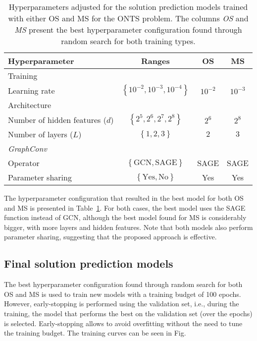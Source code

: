 \begin{table}[h]
    \centering
    \caption{Hyperparameters adjusted for the solution prediction models trained with either OS and MS for the ONTS problem. The columns  \emph{OS} and \emph{MS} present the best hyperparameter configuration found through random search for both training types.}
    \label{tab:hyperparameters}
    \begin{tabular}{l|c|c|c}
	\toprule
	Hyperparameter & Ranges & OS & MS \\
	\midrule
	Training & & & \\
	\quad Learning rate & $\left\{ 10^{-2}, 10^{-3}, 10^{-4} \right\} $   & $10^{-2}$ & $10^{-3}$ \\
	Architecture &  & & \\
	\quad Number of hidden features ($d$) & $\left\{ 2^{5},2^{6},2^{7},2^{8} \right\} $   & $2^{6}$ & $2^{8}$ \\
	\quad Number of layers ($L$)  & $\left\{ 1, 2, 3 \right\} $   & $2$ & $3$ \\
	\emph{GraphConv} &  & & \\
	\quad Operator & $\left\{ \text{GCN}, \text{SAGE} \right\} $   & SAGE & SAGE \\
	\quad Parameter sharing & $\left\{ \text{Yes}, \text{No} \right\} $   & Yes & Yes \\
	\bottomrule
    \end{tabular}
\end{table}

The hyperparameter configuration that resulted in the best model for both OS and MS is presented in Table~\ref{tab:hyperparameters}.
For both cases, the best model uses the SAGE function instead of GCN, although the best model found for MS is considerably bigger, with more layers and hidden features.
Note that both models also perform parameter sharing, suggesting that the proposed approach is effective.

\subsection{Final solution prediction models}

The best hyperparameter configuration found through random search for both OS and MS is used to train new models with a training budget of 100 epochs.
However, early-stopping is performed using the validation set, i.e., during the training, the model that performs the best on the validation set (over the epochs) is selected.
Early-stopping allows to avoid overfitting without the need to tune the training budget.
The training curves can be seen in Fig.~

